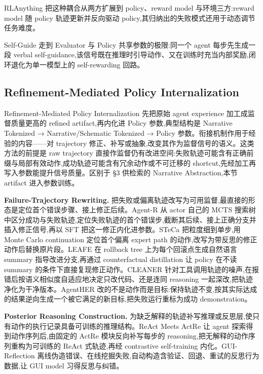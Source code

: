 RLAnything \cite{Wan26u} 把这种耦合从两方扩展到 policy、reward model 与环境三方:reward model 随 policy 轨迹更新并反向驱动 policy,其归纳出的失败模式还用于动态调节任务难度。

Self-Guide \cite{Wan26aj} 走到 Evaluator 与 Policy 共享参数的极限:同一个 agent 每步先生成一段 verbal self-guidance,该信号既在推理时引导动作、又在训练时充当内部奖励,闭环退化为单一模型上的 self-rewarding 回路。

\subsection{Refinement-Mediated Policy Internalization}

Refinement-Mediated Policy Internalization 先把原始 agent experience 加工成监督质量更高的 refined artifact,再内化进 Policy 参数,典型结构是 Narrative Tokenized → Narrative/Schematic Tokenized → Policy 参数。衔接机制作用于经验的内容——对 trajectory 修正、补写或抽象,改变其作为监督信号的语义。这类方法的前提是 raw trajectory 直接作监督仍有改进空间:失败轨迹可能含有正确前缀与局部有效动作,成功轨迹可能含有冗余动作或不可迁移的 shortcut,先经加工再写入参数能提升信号质量。区别于 §3 供检索的 Narrative Abstraction,本节 artifact 进入参数训练。

\textbf{Failure-Trajectory Rewriting.} 把失败或偏离轨迹改写为可用监督,最直接的形态是定位首个错误步骤、接上修正后续。Agent-R \cite{Yua25c} 从 actor 自己的 MCTS 搜索树中区分成功与失败轨迹,定位失败轨迹的首个错误步,截断其后续、接上正确分支并插入修正信号,再以 SFT 把这一修正内化进参数。STeCa \cite{Wan25x} 把粒度细到单步,用 Monte Carlo continuation 定位首个偏离 expert path 的动作,改写为带反思的修正动作后替换原片段。LEAFE \cite{Ge26} 在 rollback tree 上为每个回滚点生成自然语言 summary 指导改进分支,再通过 counterfactual distillation 让 policy 在不读 summary 的条件下直接复现修正动作。CLEANER \cite{Xu26j} 针对工具调用轨迹的噪声,在报错后按语义相似度自适应地决定只改代码、还是连同 reasoning 一起深改,把轨迹净化为干净版本。AgentHER \cite{Din26} 改的不是动作而是目标:保持轨迹不变,按其实际达成的结果逆向生成一个被它满足的新目标,把失败运行重标为成功 demonstration。

\textbf{Posterior Reasoning Construction.} 为缺乏解释的轨迹补写推理或反思层,使只有动作的执行记录具备可训练的推理结构。ReAct Meets ActRe \cite{Yan24m} 让 agent 探索得到动作序列后,由固定的 ActRe 模块反向补写每步的 reasoning,把无解释的动作序列重构为可训练的 ReAct 式轨迹,再经 contrastive self-training 内化。GUI-Reflection \cite{Wu25b} 离线伪造错误、在线挖掘失败,自动构造含验证、回退、重试的反思行为数据,让 GUI model 习得反思与纠错。


